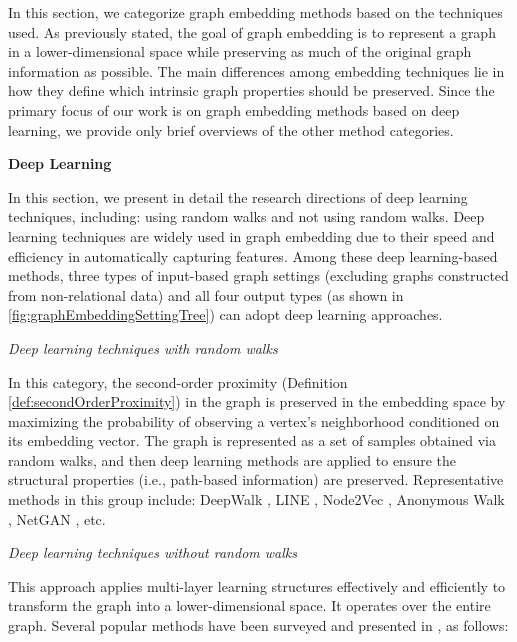 In this section, we categorize graph embedding methods based on the techniques used. As previously stated, the goal of graph embedding is to represent a graph in a lower-dimensional space while preserving as much of the original graph information as possible. The main differences among embedding techniques lie in how they define which intrinsic graph properties should be preserved. Since the primary focus of our work is on graph embedding methods based on deep learning, we provide only brief overviews of the other method categories.


\textbf{Deep Learning}

In this section, we present in detail the research directions of deep learning techniques, including: using random walks and not using random walks. Deep learning techniques are widely used in graph embedding due to their speed and efficiency in automatically capturing features. Among these deep learning-based methods, three types of input-based graph settings (excluding graphs constructed from non-relational data) and all four output types (as shown in \autoref{fig:graphEmbeddingSettingTree}) can adopt deep learning approaches.

\textit{Deep learning techniques with random walks}

In this category, the second-order proximity (Definition \ref{def:secondOrderProximity}) in the graph is preserved in the embedding space by maximizing the probability of observing a vertex's neighborhood conditioned on its embedding vector. The graph is represented as a set of samples obtained via random walks, and then deep learning methods are applied to ensure the structural properties (i.e., path-based information) are preserved. Representative methods in this group include: DeepWalk \cite{perozzi2014deepwalk}, LINE \cite{tang2015line}, Node2Vec \cite{grover2016node2vec}, Anonymous Walk \cite{ivanov2018anonymous}, NetGAN \cite{bojchevski2018netgan}, etc.

\textit{Deep learning techniques without random walks}

This approach applies multi-layer learning structures effectively and efficiently to transform the graph into a lower-dimensional space. It operates over the entire graph. Several popular methods have been surveyed and presented in \cite{rossi2020knowledge}, as follows:

